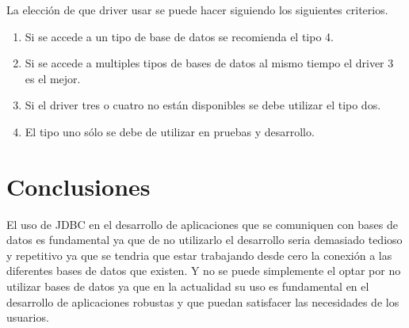 \documentclass[a4paper,12pt]{article}
\begin{document}
La elección de que driver usar se puede hacer siguiendo los siguientes criterios.
\begin{enumerate}
 \item Si se accede a un tipo de base de datos se recomienda el tipo 4.
 \item Si se accede a multiples tipos de bases de datos al mismo tiempo el driver 3 es el mejor.
 \item Si el driver tres o cuatro no están disponibles se debe utilizar el tipo dos.
 \item El tipo uno sólo se debe de utilizar en pruebas y desarrollo.
\end{enumerate}

\section{Conclusiones}
El uso de JDBC en el desarrollo de aplicaciones que se comuniquen con bases de datos es fundamental ya que de no utilizarlo el desarrollo seria demasiado tedioso y repetitivo ya que se tendria que estar trabajando desde cero la conexión a las diferentes bases de datos que existen. Y no se puede simplemente el optar por no utilizar bases de datos ya que en la actualidad su uso es fundamental en el desarrollo de aplicaciones robustas y que puedan satisfacer las necesidades de los usuarios.



\end{document}
